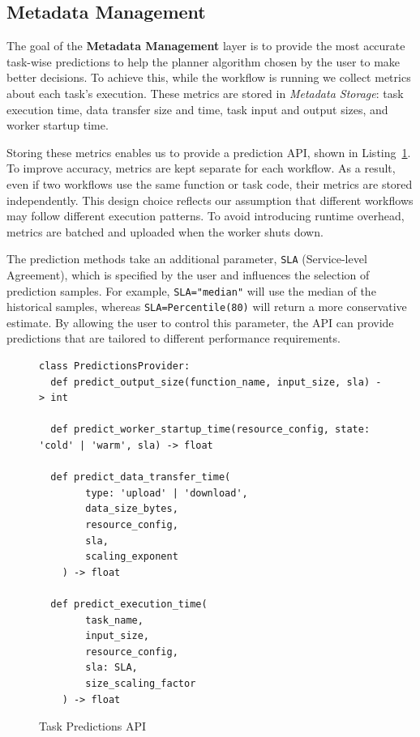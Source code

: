 \documentclass[conference]{IEEEtran}
\begin{document}
\subsection{Metadata Management}
\label{ss:metadata_management}
The goal of the \textbf{Metadata Management} layer is to provide the most accurate task-wise predictions to help the planner algorithm chosen by the user to make better decisions. To achieve this, while the workflow is running we collect metrics about each task's execution. These metrics are stored in \textit{Metadata Storage}: task execution time, data transfer size and time, task input and output sizes, and worker startup time. 

Storing these metrics enables us to provide a prediction API, shown in Listing~\ref{lst:task_predictions_api}. To improve accuracy, metrics are kept separate for each workflow. As a result, even if two workflows use the same function or task code, their metrics are stored independently. This design choice reflects our assumption that different workflows may follow different execution patterns. To avoid introducing runtime overhead, metrics are batched and uploaded when the worker shuts down.

The prediction methods take an additional parameter, \texttt{SLA} (Service-level Agreement), which is specified by the user and influences the selection of prediction samples. For example, \texttt{SLA="median"} will use the median of the historical samples, whereas \texttt{SLA=Percentile(80)} will return a more conservative estimate. By allowing the user to control this parameter, the API can provide predictions that are tailored to different performance requirements.

\begin{figure}[h]
\centering
\begin{lstlisting}[basicstyle=\ttfamily\footnotesize, columns=fullflexible, breaklines=true]
class PredictionsProvider:
  def predict_output_size(function_name, input_size, sla) -> int

  def predict_worker_startup_time(resource_config, state: 'cold' | 'warm', sla) -> float

  def predict_data_transfer_time(
        type: 'upload' | 'download',
        data_size_bytes,
        resource_config,
        sla,
        scaling_exponent
    ) -> float

  def predict_execution_time(
        task_name,
        input_size,
        resource_config,
        sla: SLA,
        size_scaling_factor
    ) -> float
\end{lstlisting}
\caption{Task Predictions API}
\label{lst:task_predictions_api}
\end{figure}
\end{document}
